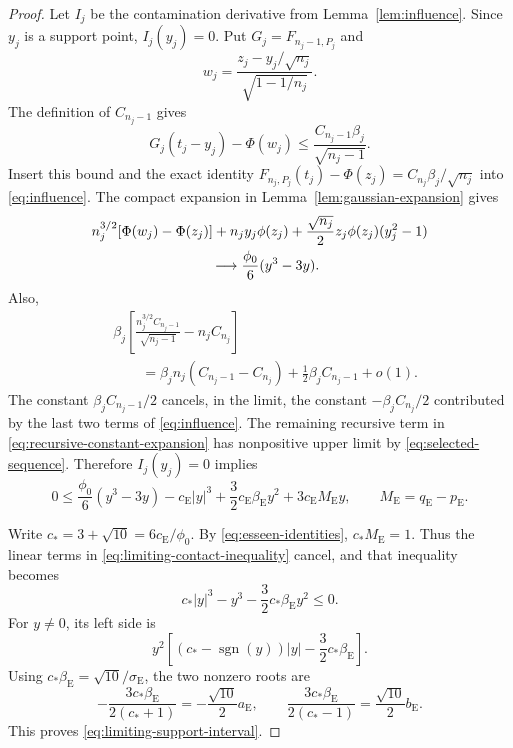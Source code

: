 \documentclass[aop]{imsart}
\theoremstyle{plain}
\theoremstyle{definition}
\theoremstyle{definition}
\newcommand{\ce}{c_{\mathrm E}}
\newcommand{\pe}{p_{\mathrm E}}
\newcommand{\qe}{q_{\mathrm E}}
\newcommand{\se}{\sigma_{\mathrm E}}
\newcommand{\be}{\beta_{\mathrm E}}
\newcommand{\aE}{a_{\mathrm E}}
\newcommand{\bE}{b_{\mathrm E}}
\DeclareMathOperator{\sgn}{sgn}
\begin{document}
\begin{proof}
Let \(I_j\) be the contamination derivative from Lemma~\ref{lem:influence}. Since \(y_j\) is a support point, \(I_j(y_j)=0\). Put \(G_j=F_{n_j-1,P_j}\) and
\[
 w_j=\frac{z_j-y_j/\sqrt{n_j}}{\sqrt{1-1/n_j}}.
\]
The definition of \(C_{n_j-1}\) gives
\[
 G_j(t_j-y_j)-\Phi(w_j)
 \le \frac{C_{n_j-1}\beta_j}{\sqrt{n_j-1}}.
\]
Insert this bound and the exact identity
\(F_{n_j,P_j}(t_j)-\Phi(z_j)=C_{n_j}\beta_j/\sqrt{n_j}\)
into \eqref{eq:influence}. The compact expansion in Lemma~\ref{lem:gaussian-expansion} gives
\begin{equation}\label{eq:sharp-gaussian-limit}
\begin{split}
 &n_j^{3/2}[\Phi(w_j)-\Phi(z_j)]
   +n_jy_j\phi(z_j)
   +\frac{\sqrt{n_j}}2z_j\phi(z_j)(y_j^2-1)\\
 &\hspace{30mm}\longrightarrow
    \frac{\phi_0}{6}(y^3-3y).
\end{split}
\end{equation}
Also,
\begin{equation}\label{eq:recursive-constant-expansion}
\begin{split}
 &\beta_j\left[
       \frac{n_j^{3/2}C_{n_j-1}}{\sqrt{n_j-1}}-n_jC_{n_j}\right]\\
 &\qquad=
 \beta_jn_j(C_{n_j-1}-C_{n_j})
 +\frac12\beta_jC_{n_j-1}+o(1).
\end{split}
\end{equation}
The constant \(\beta_jC_{n_j-1}/2\) cancels, in the limit, the constant \(-\beta_jC_{n_j}/2\) contributed by the last two terms of \eqref{eq:influence}. The remaining recursive term in \eqref{eq:recursive-constant-expansion} has nonpositive upper limit by \eqref{eq:selected-sequence}. Therefore \(I_j(y_j)=0\) implies
\begin{equation}\label{eq:limiting-contact-inequality}
 0\le\frac{\phi_0}{6}(y^3-3y)-\ce|y|^3
       +\frac32\ce\be y^2+3\ce M_{\mathrm E}y,
 \qquad M_{\mathrm E}=\qe-\pe.
\end{equation}

Write \(c_*=3+\sqrt{10}=6\ce/\phi_0\). By \eqref{eq:esseen-identities}, \(c_*M_{\mathrm E}=1\). Thus the linear terms in \eqref{eq:limiting-contact-inequality} cancel, and that inequality becomes
\begin{equation}\label{eq:contact-polynomial}
 c_*|y|^3-y^3-\frac32c_*\be y^2\le0.
\end{equation}
For \(y\ne0\), its left side is
\[
 y^2\left[(c_*-\sgn(y))|y|-\frac32c_*\be\right].
\]
Using \(c_*\be=\sqrt{10}/\se\), the two nonzero roots are
\[
 -\frac{3c_*\be}{2(c_*+1)}=-\frac{\sqrt{10}}2\aE,
 \qquad
 \frac{3c_*\be}{2(c_*-1)}=\frac{\sqrt{10}}2\bE.
\]
This proves \eqref{eq:limiting-support-interval}.
\end{proof}
\end{document}
